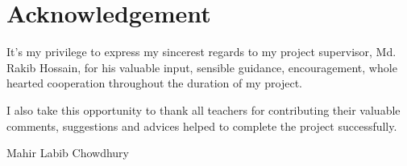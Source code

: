 \chapter*{Acknowledgement}
It’s my privilege to express my sincerest regards to my project supervisor, Md. Rakib Hossain, for his valuable input, sensible guidance, encouragement, whole hearted cooperation throughout the duration of my project.

I also take this opportunity to thank all teachers for contributing their valuable comments, suggestions and advices helped to complete the project successfully.


\vspace{2cm}

\begin{flushright}
Mahir Labib Chowdhury
\end{flushright} 